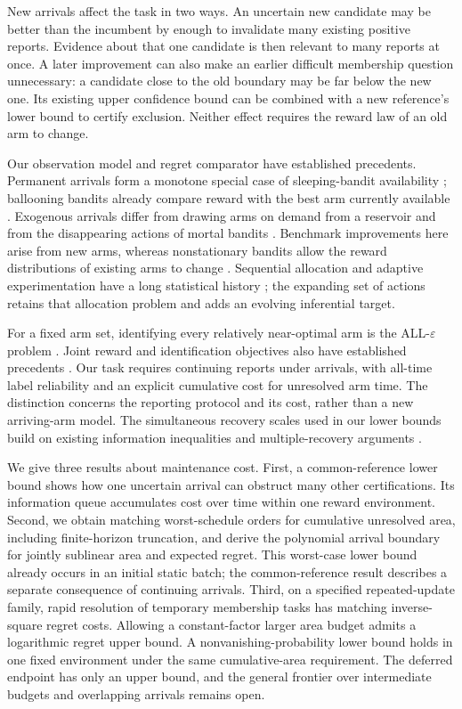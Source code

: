 \documentclass[11pt]{article}
\begin{document}
New arrivals affect the task in two ways. An uncertain new candidate may be
better than the incumbent by enough to invalidate many existing positive
reports. Evidence about that one candidate is then relevant to many
reports at once. A later improvement can also make an earlier difficult
membership question unnecessary: a candidate close to the old boundary may
be far below the new one. Its existing upper confidence bound can be
combined with a new reference's lower bound to certify exclusion. Neither
effect requires the reward law of an old arm to change.

Our observation model and regret comparator have established precedents.
Permanent arrivals form a monotone special case of sleeping-bandit
availability \citep{kleinberg2010}; ballooning bandits already compare reward
with the best arm currently available \citep{ghalme2021}. Exogenous arrivals
differ from drawing arms on demand from a reservoir
\citep{10.1214/aos/1069362389} and from the disappearing actions of mortal
bandits \citep{NIPS2008_788d9869}. Benchmark improvements here arise from new
arms, whereas nonstationary bandits allow the reward distributions of
existing arms to change \citep{Besbes2014,Auer2019ADSWITCH}. Sequential
allocation and adaptive experimentation have a long statistical history
\citep{Robbins1952,LAI19854,Lai1987}; the expanding set of actions retains
that allocation problem and adds an evolving inferential target.

For a fixed arm set, identifying every relatively near-optimal arm is the
ALL-$\varepsilon$ problem \citep{mason2020}. Joint reward and identification
objectives also have established precedents
\citep{degenne2019,yang2026,cho2025}. Our task requires continuing reports
under arrivals, with all-time label reliability and an explicit cumulative
cost for unresolved arm time. The distinction concerns the reporting
protocol and its cost, rather than a new arriving-arm model. The simultaneous
recovery scales used in our lower bounds build on existing information
inequalities and multiple-recovery arguments
\citep{kaufmann2016,malloy2014,jamieson2018}.

We give three results about maintenance cost. First, a common-reference
lower bound shows how one uncertain arrival can obstruct many other
certifications. Its information queue accumulates cost over time within
one reward environment. Second, we obtain matching worst-schedule orders
for cumulative unresolved area, including finite-horizon truncation, and
derive the polynomial arrival boundary for jointly sublinear area and
expected regret. This worst-case lower bound already occurs in an initial
static batch; the common-reference result describes a separate consequence
of continuing arrivals. Third, on a specified repeated-update family,
rapid resolution of temporary membership tasks has matching inverse-square
regret costs. Allowing a constant-factor larger area budget admits a
logarithmic regret upper bound. A nonvanishing-probability lower bound
holds in one fixed environment under the same cumulative-area requirement.
The deferred endpoint has only an upper bound, and the general frontier
over intermediate budgets and overlapping arrivals remains open.
\end{document}
